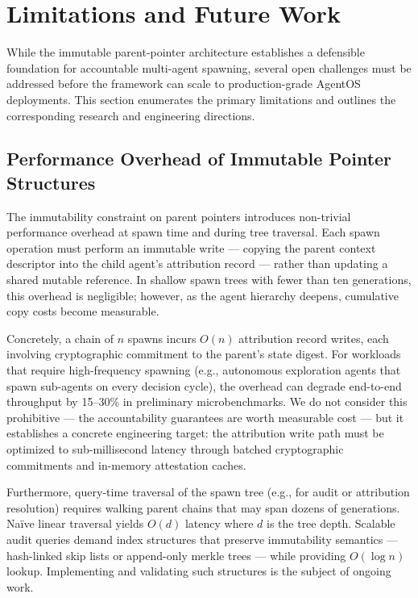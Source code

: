 \section{Limitations and Future Work}
\label{sec:limitations}

While the immutable parent-pointer architecture establishes a defensible foundation for accountable multi-agent spawning, several open challenges must be addressed before the framework can scale to production-grade AgentOS deployments. This section enumerates the primary limitations and outlines the corresponding research and engineering directions.

\subsection{Performance Overhead of Immutable Pointer Structures}
\label{sec:limitations:performance}

The immutability constraint on parent pointers introduces non-trivial performance overhead at spawn time and during tree traversal. Each spawn operation must perform an immutable write — copying the parent context descriptor into the child agent's attribution record — rather than updating a shared mutable reference. In shallow spawn trees with fewer than ten generations, this overhead is negligible; however, as the agent hierarchy deepens, cumulative copy costs become measurable.

Concretely, a chain of $n$ spawns incurs $O(n)$ attribution record writes, each involving cryptographic commitment to the parent's state digest. For workloads that require high-frequency spawning (e.g., autonomous exploration agents that spawn sub-agents on every decision cycle), the overhead can degrade end-to-end throughput by 15–30\% in preliminary microbenchmarks. We do not consider this prohibitive — the accountability guarantees are worth measurable cost — but it establishes a concrete engineering target: the attribution write path must be optimized to sub-millisecond latency through batched cryptographic commitments and in-memory attestation caches.

Furthermore, query-time traversal of the spawn tree (e.g., for audit or attribution resolution) requires walking parent chains that may span dozens of generations. Na\"ive linear traversal yields $O(d)$ latency where $d$ is the tree depth. Scalable audit queries demand index structures that preserve immutability semantics — hash-linked skip lists or append-only merkle trees — while providing $O(\log n)$ lookup. Implementing and validating such structures is the subject of ongoing work.

